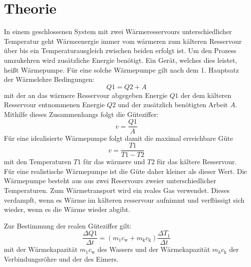 
\section{Theorie}
\label{sec:Theorie}
In einem geschlossenen System mit zwei Wärmeresservours unterschiedlicher Temperatur geht
  Wärmeenergie immer vom wärmeren zum kälteren Resservour über bis ein
  Temperaturausgleich zwischen beiden erfolgt ist. Um den Prozess
  umzukehren wird zusätzliche Energie benötigt. Ein Gerät, welches dies leistet,
  heißt Wärmepumpe. Für eine solche Wärmepumpe gilt nach dem 1. Hauptsatz der Wärmelehre Bedingungen:
  \begin{equation}
    Q1 = Q2 + A\label{eq:Q1}
  \end{equation}
mit der an das wärmere Resservour abgegeben Energie $Q1$ der dem kälteren
Resservour entnommenen Energie $Q2$ und der zusätzlich benötigten Arbeit $A$.
Mithilfe dieses Zusammenhangs folgt die Güteziffer:
\begin{equation}
  v = \frac{Q1}{A}\label{eq:v1}
  \end{equation}
  Für eine idealisierte Wärmepumpe folgt damit die maximal erreichbare Güte
  \begin{equation}
    v = \frac{T1}{T1-T2}\label{eq:vid}
  \end{equation}
  mit den Temperaturen $T1$ für das wärmere und $T2$ für das kältere Resservour.
  Für eine realistische Wärmepumpe ist die Güte daher kleiner als dieser Wert.
Die Wärmepumpe besteht aus aus zwei Reservours zweier unterschiedlicher
Temperaturen. Zum Wärmetransport wird ein reales Gas verwendet. Dieses verdampft,
wenn es Wärme im kälteren resservour aufnimmt und verflüssigt sich wieder, wenn es
die Wärme wieder abgibt.



Zur Bestimmung der realen Güteziffer gilt:
\begin{equation}
  \frac{\Delta Q1}{\Delta t} = \left( m_1 c_\text{w} + m_\text{k}c_\text{k}\right) \frac{\Delta T_1}{\Delta t}
\end{equation}
mit der Wärmekapazität $m_1 c_\text{w}$ des Wassers und der Wärmekapazität $m_k c_\text{k}$
der Verbindungsröhre und der des Eimers.
